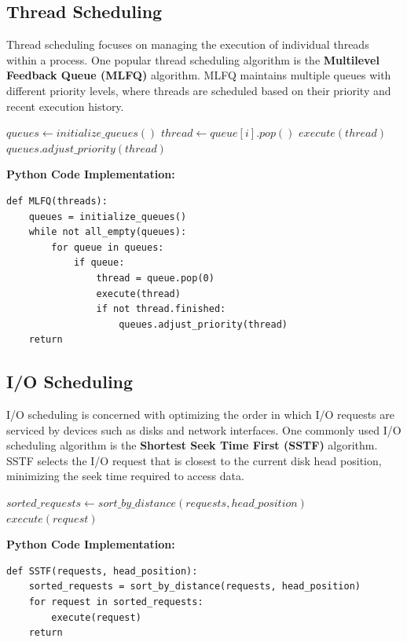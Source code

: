 \documentclass[12pt]{book} %
\begin{document}
\subsection{Thread Scheduling}
Thread scheduling focuses on managing the execution of individual threads within a process. One popular thread scheduling algorithm is the \textbf{Multilevel Feedback Queue (MLFQ)} algorithm. MLFQ maintains multiple queues with different priority levels, where threads are scheduled based on their priority and recent execution history.
\FloatBarrier
\begin{algorithm}
\caption{Multilevel Feedback Queue (MLFQ) Scheduling Algorithm}\label{mlfq}
\begin{algorithmic}[1]
\State $queues \gets initialize\_queues()$
\State $thread \gets queue[i].pop()$
\State $execute(thread)$
\State $queues.adjust\_priority(thread)$
\EndIf
\EndIf
\EndFor
\EndWhile
\EndProcedure
\end{algorithmic}
\end{algorithm}
\FloatBarrier
\textbf{Python Code Implementation:}
\FloatBarrier
\begin{lstlisting}
def MLFQ(threads):
    queues = initialize_queues()
    while not all_empty(queues):
        for queue in queues:
            if queue:
                thread = queue.pop(0)
                execute(thread)
                if not thread.finished:
                    queues.adjust_priority(thread)
    return
\end{lstlisting}

\subsection{I/O Scheduling}
I/O scheduling is concerned with optimizing the order in which I/O requests are serviced by devices such as disks and network interfaces. One commonly used I/O scheduling algorithm is the \textbf{Shortest Seek Time First (SSTF)} algorithm. SSTF selects the I/O request that is closest to the current disk head position, minimizing the seek time required to access data.
\FloatBarrier
\begin{algorithm}
\caption{Shortest Seek Time First (SSTF) Scheduling Algorithm}\label{sstf}
\begin{algorithmic}[1]
\State $sorted\_requests \gets sort\_by\_distance(requests, head\_position)$
\State $execute(request)$
\EndFor
\EndProcedure
\end{algorithmic}
\end{algorithm}
\FloatBarrier
\textbf{Python Code Implementation:}
\FloatBarrier
\begin{lstlisting}
def SSTF(requests, head_position):
    sorted_requests = sort_by_distance(requests, head_position)
    for request in sorted_requests:
        execute(request)
    return
\end{lstlisting}
\end{document}
